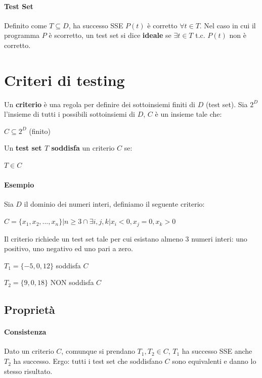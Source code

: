 \paragraph{Test Set} Definito come $T \subseteq D$, ha successo SSE $P(t)$ è corretto $\forall t \in T$. Nel caso in cui il programma $P$ è scorretto, un test set si dice \textbf{ideale} se $\exists t \in T$ t.c. $P(t)$ non è corretto.

\section{Criteri di testing}

Un \textbf{criterio} è una regola per definire dei sottoinsiemi finiti di $D$ (test set).
Sia $2^D$ l'insieme di tutti i possibili sottoinsiemi di $D$, $C$ è un insieme tale che:
\begin{center}
    $C \subseteq 2^D$ (finito)
\end{center}
Un \textbf{test set $T$ soddisfa} un criterio $C$ se:
\begin{center}
    $T \in C$    
\end{center}

\paragraph{Esempio} Sia $D$ il dominio dei numeri interi, definiamo il seguente criterio:
\begin{center}
    $C = \{x_1, x_2, ..., x_n\} | n \ge 3 \cap \exists i, j, k | x_i < 0, x_j = 0, x_k > 0$    
\end{center}
Il criterio richiede un test set tale per cui esistano almeno 3 numeri interi: uno positivo, uno negativo ed uno pari a zero.
\begin{center}
    $T_1 = \{-5, 0, 12\}$ soddisfa $C$    
\end{center}
\begin{center}
    $T_2 = \{9, 0, 18\}$ NON soddisfa $C$    
\end{center}

\subsection{Proprietà}

\paragraph{Consistenza} Dato un criterio $C$, comunque si prendano $T_1, T_2 \in C$, $T_1$ ha successo SSE anche $T_2$ ha successo. Ergo: tutti i test set che soddisfano $C$ sono equivalenti e danno lo stesso risultato.

